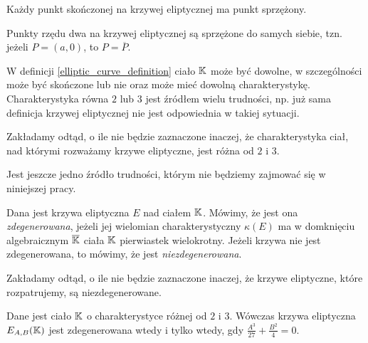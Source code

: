 \begin{fact}
Każdy punkt skończonej na krzywej eliptycznej ma punkt sprzężony.
\end{fact}

\begin{fact}
Punkty rzędu dwa na krzywej eliptycznej są sprzężone do samych siebie,
tzn. jeżeli $P = (a, 0)$, to $P = \overline{P}$.
\end{fact}

\noindent
W definicji \ref{elliptic_curve_definition} ciało $\mathbb{K}$ może być dowolne,
w szczególności może być skończone lub nie
oraz może mieć dowolną charakterystykę.
Charakterystyka równa $2$ lub $3$ jest źródłem wielu trudności,
np. już sama definicja krzywej eliptycznej
nie jest odpowiednia w takiej sytuacji.

\begin{remark}
Zakładamy odtąd, o ile nie będzie zaznaczone inaczej,
że charakterystyka ciał, nad którymi rozważamy krzywe eliptyczne,
jest różna od $2$ i $3$.
\end{remark}

\noindent
Jest jeszcze jedno źródło trudności,
którym nie będziemy zajmować się w niniejszej pracy.

\begin{definition}
Dana jest krzywa eliptyczna $E$ nad ciałem $\mathbb{K}$.
Mówimy, że jest ona \emph{zdegenerowana},
jeżeli jej wielomian charakterystyczny $\kappa(E)$
ma w domknięciu algebraicznym $\overline{\mathbb{K}}$ ciała $\mathbb{K}$
pierwiastek wielokrotny.
Jeżeli krzywa nie jest zdegenerowana,
to mówimy, że jest \emph{niezdegenerowana}.
\end{definition}

\begin{remark}
Zakładamy odtąd, o ile nie będzie zaznaczone inaczej,
że krzywe eliptyczne, które rozpatrujemy,
są niezdegenerowane.
\end{remark}

\begin{theorem}
Dane jest ciało $\mathbb{K}$ o charakterystyce różnej od $2$ i $3$.
Wówczas krzywa eliptyczna $E_{A,B}(\mathbb{K})$ jest zdegenerowana wtedy i tylko wtedy,
gdy $\frac{A^3}{27} + \frac{B^2}{4} = 0$.
\end{theorem}
